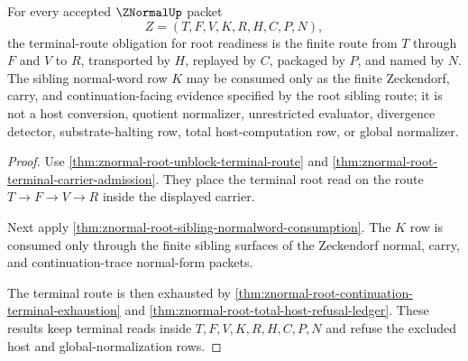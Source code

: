 \begin{theorem}
\label{thm:znormal-terminal-route-obligation-completion}
For every accepted $\ZNormalUp$ packet
$$
Z=(T,F,V,K,R,H,C,P,N),
$$
the terminal-route obligation for root readiness is the finite route from $T$ through $F$ and $V$ to $R$, transported by $H$, replayed by $C$, packaged by $P$, and named by $N$. The sibling normal-word row $K$ may be consumed only as the finite Zeckendorf, carry, and continuation-facing evidence specified by the root sibling route; it is not a host conversion, quotient normalizer, unrestricted evaluator, divergence detector, substrate-halting row, total host-computation row, or global normalizer.
\end{theorem}
\begin{proof}
Use \autoref{thm:znormal-root-unblock-terminal-route} and \autoref{thm:znormal-root-terminal-carrier-admission}. They place the terminal root read on the route $T \to F \to V \to R$ inside the displayed carrier.

Next apply \autoref{thm:znormal-root-sibling-normalword-consumption}. The $K$ row is consumed only through the finite sibling surfaces of the Zeckendorf normal, carry, and continuation-trace normal-form packets.

The terminal route is then exhausted by \autoref{thm:znormal-root-continuation-terminal-exhaustion} and \autoref{thm:znormal-root-total-host-refusal-ledger}. These results keep terminal reads inside $T,F,V,K,R,H,C,P,N$ and refuse the excluded host and global-normalization rows.
\end{proof}

